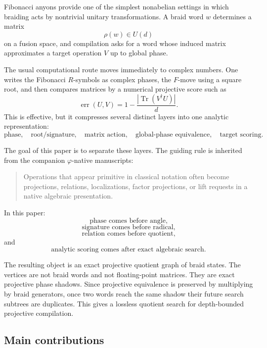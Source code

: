 \documentclass[11pt]{article}
\newcommand{\ph}{\varphi}
\newcommand{\Tr}{\operatorname{Tr}}
\newcommand{\err}{\operatorname{err}}
\begin{document}
Fibonacci anyons provide one of the simplest nonabelian settings in which braiding acts by nontrivial unitary transformations.  A braid word $w$ determines a matrix
\[
    \rho(w)\in U(d)
\]
on a fusion space, and compilation asks for a word whose induced matrix approximates a target operation $V$ up to global phase.

The usual computational route moves immediately to complex numbers.  One writes the Fibonacci $R$-symbols as complex phases, the $F$-move using a square root, and then compares matrices by a numerical projective score such as
\[
    \err(U,V)=1-\frac{|\Tr(V^\dagger U)|}{d}.
\]
This is effective, but it compresses several distinct layers into one analytic representation:
\[
    \text{phase},\quad
    \text{root/signature},\quad
    \text{matrix action},\quad
    \text{global-phase equivalence},\quad
    \text{target scoring}.
\]

The goal of this paper is to separate these layers.  The guiding rule is inherited from the companion $\ph$-native manuscripts:

\begin{quote}
Operations that appear primitive in classical notation often become projections, relations, localizations, factor projections, or lift requests in a native algebraic presentation.
\end{quote}

In this paper:
\[
    \text{phase comes before angle,}
\]
\[
    \text{signature comes before radical,}
\]
\[
    \text{relation comes before quotient,}
\]
and
\[
    \text{analytic scoring comes after exact algebraic search.}
\]

The resulting object is an exact projective quotient graph of braid states.  The vertices are not braid words and not floating-point matrices.  They are exact projective phase shadows.  Since projective equivalence is preserved by multiplying by braid generators, once two words reach the same shadow their future search subtrees are duplicates.  This gives a lossless quotient search for depth-bounded projective compilation.

\subsection*{Main contributions}
\end{document}
